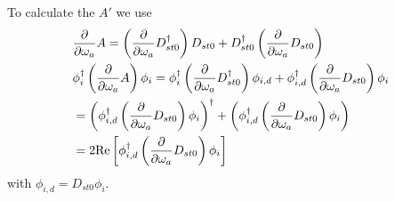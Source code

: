 To calculate the $A'$ we use
\begin{equation}
\begin{split}
&\frac{\partial }{\partial \omega _a}A = \left(\frac{\partial }{\partial \omega _a}D^{\dagger}_{st0}\right)D_{st0}+D^{\dagger}_{st0}\left(\frac{\partial }{\partial \omega _a}D_{st0}\right)\\
&\phi _i^{\dagger}\left(\frac{\partial }{\partial \omega _a}A\right)\phi _i = \phi _i^{\dagger}\left(\frac{\partial }{\partial \omega _a}D^{\dagger}_{st0}\right)\phi _{i,d}+\phi _{i,d}^{\dagger}\left(\frac{\partial }{\partial \omega _a}D_{st0}\right)\phi _i\\
&=\left(\phi _{i,d}^{\dagger}\left(\frac{\partial }{\partial \omega _a}D_{st0}\right)\phi _i\right)^{\dagger}+\left(\phi _{i,d}^{\dagger}\left(\frac{\partial }{\partial \omega _a}D_{st0}\right)\phi _i\right)\\
&=2{\rm Re}\left[\phi _{i,d}^{\dagger}\left(\frac{\partial }{\partial \omega _a}D_{st0}\right)\phi _i\right]
\end{split}
\end{equation}
with $\phi _{i,d}=D_{st0}\phi _i$.

